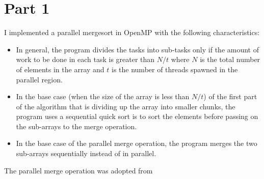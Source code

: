 \section{Part 1}
\label{sec:part1}

I implemented a parallel mergesort in OpenMP with the following characteristics:

\begin{itemize}
	\item In general, the program divides the tasks into sub-tasks only if the amount of work to be done in each task is greater than $N/t$ where $N$ is the total number of elements in the array and $t$ is the number of threads spawned in the parallel region.
	\item In the base case (when the size of the array is less than $N/t$) of the first part of the algorithm that is dividing up the array into smaller chunks, the program uses a sequential quick sort is to sort the elements before passing on the sub-arrays to the merge operation.
	\item In the base case of the parallel merge operation, the program merges the two sub-arrays sequentially instead of in parallel.
\end{itemize}

The parallel merge operation was adopted from ~\cite{thomas2001introduction}
